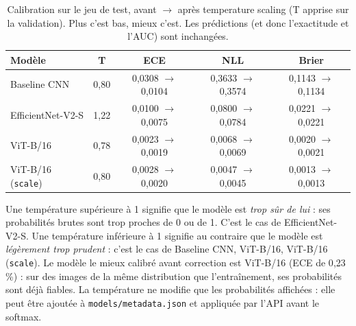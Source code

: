 \begin{table}[H]
\centering\small
\begin{tabular}{@{}lcccc@{}}
\toprule
\textbf{Modèle} & \textbf{T} & \textbf{ECE} & \textbf{NLL} & \textbf{Brier} \\
\midrule
Baseline CNN & 0{,}80 & 0{,}0308 $\to$ 0{,}0104 & 0{,}3633 $\to$ 0{,}3574 & 0{,}1143 $\to$ 0{,}1134 \\
EfficientNet-V2-S & 1{,}22 & 0{,}0100 $\to$ 0{,}0075 & 0{,}0800 $\to$ 0{,}0784 & 0{,}0221 $\to$ 0{,}0221 \\
ViT-B/16 & 0{,}78 & 0{,}0023 $\to$ 0{,}0019 & 0{,}0068 $\to$ 0{,}0069 & 0{,}0020 $\to$ 0{,}0021 \\
ViT-B/16 (\texttt{scale}) & 0{,}80 & 0{,}0028 $\to$ 0{,}0020 & 0{,}0047 $\to$ 0{,}0045 & 0{,}0013 $\to$ 0{,}0013 \\
\bottomrule
\end{tabular}
\caption{Calibration sur le jeu de test, avant $\to$ après temperature scaling (T apprise sur la validation). Plus c'est bas, mieux c'est. Les prédictions (et donc l'exactitude et l'AUC) sont inchangées.}
\end{table}
Une température supérieure à 1 signifie que le modèle est \emph{trop sûr de lui} : ses probabilités brutes sont trop proches de 0 ou de 1. C'est le cas de EfficientNet-V2-S. Une température inférieure à 1 signifie au contraire que le modèle est \emph{légèrement trop prudent} : c'est le cas de Baseline CNN, ViT-B/16, ViT-B/16 (\texttt{scale}). Le modèle le mieux calibré avant correction est ViT-B/16 (ECE de 0{,}23\,\%) : sur des images de la même distribution que l'entraînement, ses probabilités sont déjà fiables. La température ne modifie que les probabilités affichées : elle peut être ajoutée à \texttt{models/metadata.json} et appliquée par l'API avant le softmax.
